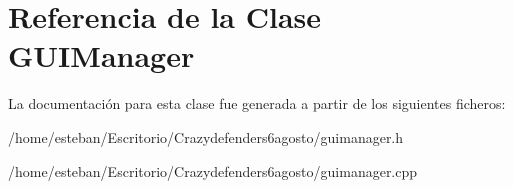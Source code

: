\hypertarget{class_g_u_i_manager}{\section{Referencia de la Clase G\+U\+I\+Manager}
\label{class_g_u_i_manager}
}


La documentación para esta clase fue generada a partir de los siguientes ficheros\+:\begin{DoxyCompactItemize}
\item 
/home/esteban/\+Escritorio/\+Crazydefenders6agosto/guimanager.\+h\item 
/home/esteban/\+Escritorio/\+Crazydefenders6agosto/guimanager.\+cpp\end{DoxyCompactItemize}
